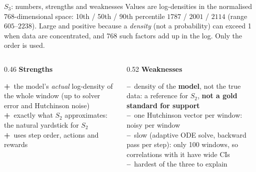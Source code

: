 \documentclass[aspectratio=169,11pt]{beamer}
\newcommand{\pro}{\textcolor{green!45!black}{\textbf{+}}\ }
\newcommand{\con}{\textcolor{red!60!black}{\textbf{--}}\ }
\begin{document}
\begin{frame}{$S_3$: numbers, strengths and weaknesses}
\small
Values are log-densities in the normalised 768-dimensional space: 10th / 50th / 90th percentile $1787$ / $2001$ / $2114$ (range $605$--$2238$). Large and positive because a \emph{density} (not a probability) can exceed 1 when data are concentrated, and 768 such factors add up in the log. Only the order is used.
\vspace{0.5em}

\begin{columns}[T]
\begin{column}{0.46\linewidth}
\textbf{Strengths}
\vspace{0.3em}

\pro the model's \emph{actual} log-density of the whole window (up to solver error and Hutchinson noise)\\[3pt]
\pro exactly what $S_2$ approximates: the natural yardstick for $S_2$\\[3pt]
\pro uses step order, actions and rewards
\end{column}
\begin{column}{0.52\linewidth}
\textbf{Weaknesses}
\vspace{0.3em}

\con density of the \textbf{model}, not the true data: a reference for $S_2$, \textbf{not a gold standard for support}\\[3pt]
\con one Hutchinson vector per window: noisy per window\\[3pt]
\con slow (adaptive ODE solve, backward pass per step): only 100 windows, so correlations with it have wide CIs\\[3pt]
\con hardest of the three to explain
\end{column}
\end{columns}
\end{frame}

\end{document}
